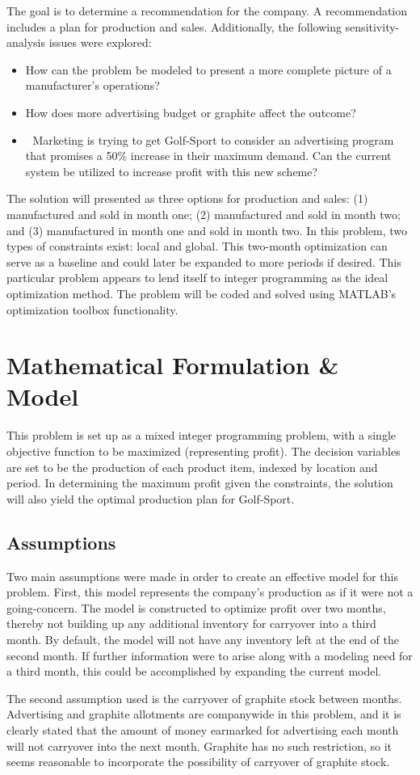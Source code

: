 \documentclass{article}
\begin{document}
\par
The goal is to determine a recommendation for the company. A recommendation includes a plan for production and sales. Additionally, the following sensitivity-analysis issues were explored:
\begin{itemize}
	\item How can the problem be modeled to present a more complete picture of a manufacturer’s operations?
	\item How does more advertising budget or graphite affect the outcome?
	\item 	Marketing is trying to get Golf-Sport to consider an advertising program that promises a 50\% increase in their maximum demand. Can the 		current system be utilized to increase profit with this new scheme?
\end{itemize}
\par
The solution will presented as three options for production and sales: (1) manufactured and sold in month one; (2) manufactured and sold in month two; and (3) manufactured in month one and sold in month two. In this problem, two types of constraints exist: local and global. This two-month optimization can serve as a baseline and could later be expanded to more periods if desired. This particular problem appears to lend itself to integer programming as the ideal optimization method. The problem will be coded and solved using MATLAB’s optimization toolbox functionality.
\section{Mathematical Formulation \& Model}
This problem is set up as a mixed integer programming problem, with a single objective function to be maximized (representing profit).  
The decision variables are set to be the production of each product item, indexed by location and period.  In determining the maximum profit given the constraints, 
the solution will also yield the optimal production plan for Golf-Sport.
\subsection{Assumptions}
Two main assumptions were made in order to create an effective model for this problem.  First, this model represents the company's production as if it were not a 
going-concern.  The model is constructed to optimize profit over two months, thereby not building up any additional inventory for carryover into 
a third month.  By default, the model will not have any inventory left at the end of the second month.  If further information were to arise along with 
a modeling need for a third month, this could be accomplished by expanding the current model. \par
The second assumption used is the carryover of graphite stock between months.  Advertising and graphite allotments are companywide in this problem, and 
it is clearly stated that the amount of money earmarked for advertising each month will not carryover into the next month.  Graphite has no such restriction, so 
it seems reasonable to incorporate the possibility of carryover of graphite stock.
\end{document}
